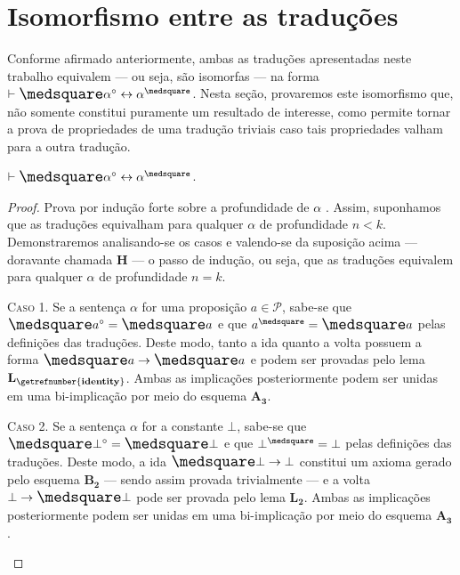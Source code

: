 \section{Isomorfismo entre as traduções}

Conforme afirmado anteriormente, ambas as traduções apresentadas neste trabalho equivalem --- ou seja, são isomorfas --- na forma $\entails\nec\alpha^\circ\leftrightarrow\alpha^\medsquare$. Nesta seção, provaremos este isomorfismo que, não somente constitui puramente um resultado de interesse, como permite tornar a prova de propriedades de uma tradução triviais caso tais propriedades valham para a outra tradução.

\begin{theorem}\label{isomorphism}
    $\entails\nec\alpha^\circ\leftrightarrow\alpha^\medsquare$.

    \begin{proof}
        Prova por indução forte sobre a profundidade de $\alpha$ \citep{Troelstra}.
        Assim, suponhamos que as traduções equivalham para qualquer $\alpha$ de profundidade $n<k$.
        Demonstraremos analisando-se os casos e valendo-se da suposição acima --- doravante chamada $\mathbf{H}$ --- o passo de indução, ou seja, que as traduções equivalem para qualquer $\alpha$ de profundidade $n=k$.

        \begin{case}
            \textsc{Caso 1.}
            Se a sentença $\alpha$ for uma proposição $a\in\mathcal{P}$, sabe-se que $\nec a^\circ=\nec a$ e que $a^\medsquare=\nec a$ pelas definições das traduções.
            Deste modo, tanto a ida quanto a volta possuem a forma $\nec a\to\nec a$ e podem ser provadas pelo lema \hyperref[identity]{$\mathbf{L_\getrefnumber{identity}}$}.
            Ambas as implicações posteriormente podem ser unidas em uma bi-implicação por meio do esquema \hyperref[MA3]{$\mathbf{A_3}$}.
        \end{case}

        \begin{case}
            \textsc{Caso 2.}
            Se a sentença $\alpha$ for a constante $\bot$, sabe-se que $\nec\bot^\circ=\nec\bot$ e que $\bot^\medsquare=\bot$ pelas definições das traduções.
            Deste modo, a ida $\nec\bot\to\bot$ constitui um axioma gerado pelo esquema \hyperref[MB2]{$\mathbf{B_2}$} --- sendo assim provada trivialmente --- e a volta $\bot\to\nec\bot$ pode ser provada pelo lema \hyperref[explosion]{$\mathbf{L_2}$}.
            Ambas as implicações posteriormente podem ser unidas em uma bi-implicação por meio do esquema \hyperref[MA3]{$\mathbf{A_3}$}.
        \end{case}


\end{proof}
\end{theorem}
